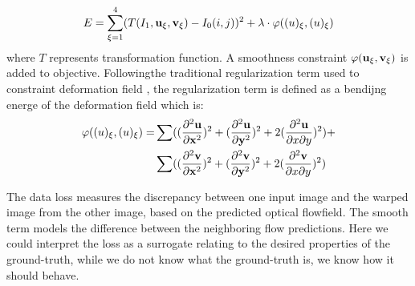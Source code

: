 \documentclass{iitthesis}
\begin{document}
\begin{equation}
E = \sum_{\xi = 1}^4(T(I_1, \bold{u}_{\xi}, \bold{v}_{\xi})-I_0(i, j))^2 + \lambda\cdot\varphi(\bold(u)_{\xi}, \bold(u)_{\xi})
\end{equation}
where $T$ represents transformation function. A smoothness constraint $\varphi(\bold{u}_{\xi}, \bold{v}_{\xi})$ is added to objective. Followingthe traditional regularization term used to constraint deformation field \cite{rohlfing2003volume}\cite{ashburner1999nonlinear}, the regularization term is defined as a bendijng energe of the deformation field which is:
\begin{align*}
\varphi(\bold(u)_{\xi}, \bold(u)_{\xi}) = & \sum ((\frac{\partial^2\bold{u}}{\partial \bold{x}^2})^2+(\frac{\partial^2\bold{u}}{\partial \bold{y}^2})^2+2(\frac{\partial^2\bold{u}}{\partial x \partial y})^2) + \\ 
& \sum ((\frac{\partial^2\bold{v}}{\partial \bold{x}^2})^2+(\frac{\partial^2\bold{v}}{\partial \bold{y}^2})^2+2(\frac{\partial^2\bold{v}}{\partial x \partial y})^2)
\end{align*}

The data loss measures the discrepancy between one input image and the warped image from the other image, based on the predicted optical flowfield. The smooth term models the difference between the neighboring flow predictions. Here we could interpret the loss as a surrogate relating to the desired properties of the ground-truth, while we do not know what the ground-truth is, we know how it should behave.
\end{document}
